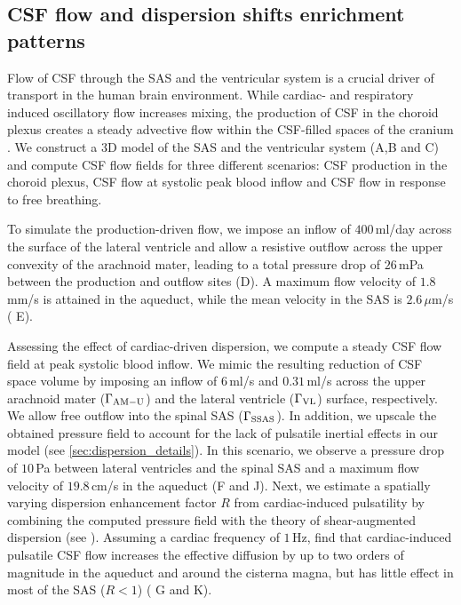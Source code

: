 \documentclass[fleqn,10pt]{wlscirep}
\begin{document}
\subsection*{CSF flow and dispersion shifts enrichment patterns}

Flow of CSF through the SAS and the ventricular system is a crucial driver of transport in the human brain environment.
While cardiac- and respiratory induced oscillatory flow increases mixing, the production of CSF in the choroid plexus creates a steady advective flow within the CSF-filled spaces of the cranium \cite{hornkjol2022csf}. 
We construct a 3D model of the SAS and the ventricular system (A,B and C) and compute CSF flow fields for three different scenarios: CSF production in the choroid plexus, CSF flow at systolic peak blood inflow and CSF flow in response to free breathing.

To simulate the production-driven flow, we impose an inflow of $400\,$ml/day \cite{nilsson1992circadian} across the surface of the lateral ventricle and allow a resistive outflow across the upper convexity of the arachnoid mater, leading to a total pressure drop of $26\,$mPa between the production and outflow sites (D). A maximum flow velocity of $1.8\,$mm/s is attained in the aqueduct, while the mean velocity in the SAS is $2.6\,\mu$m/s ( E).


Assessing the effect of cardiac-driven dispersion, we compute a steady CSF flow field at peak systolic blood inflow. We mimic the resulting reduction of CSF space volume by imposing an inflow of $6\,$ml/s \cite{baledent2014imaging, causemann2022human} and $0.31\,$ml/s \cite{vinje2019respiratory} across the upper arachnoid mater ($\Gamma_{\rm AM-U}$) and the lateral ventricle ($\Gamma_{\rm VL}$) surface, respectively. We allow free outflow into the spinal SAS ($\Gamma_{\rm SSAS}$). In addition, we upscale the obtained pressure field to account for the lack of pulsatile inertial effects in our model (see \ref{sec:dispersion_details}). In this scenario, we observe a pressure drop of $10\,$Pa between lateral ventricles and the spinal SAS and a maximum flow velocity of $19.8\,$cm/s in the aqueduct (F and J).
Next, we estimate a spatially varying dispersion enhancement factor $R$ from cardiac-induced pulsatility by combining the computed pressure field with the theory of shear-augmented dispersion (see ). Assuming a cardiac frequency of $1\,$Hz, find that cardiac-induced pulsatile CSF flow increases the effective diffusion by up to two orders of magnitude in the aqueduct and around the cisterna magna, but has little effect in most of the SAS ($R < 1$) ( G and K). 
\end{document}
